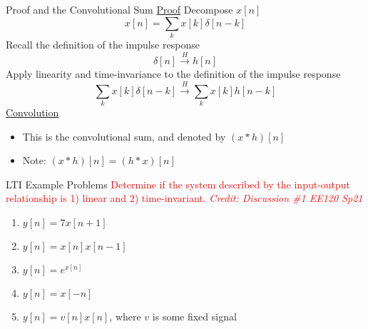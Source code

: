\begin{frame}{Proof and the Convolutional Sum}
    \underline{Proof}
    Decompose $x[n]$
    \[x[n] = \sum_k x[k]\delta[n-k]\]
    Recall the definition of the impulse response
    \[\delta[n] \overset{H}{\longrightarrow} h[n]\]
    Apply linearity and time-invariance to the definition of the impulse response
    \[\sum_k x[k]\delta[n-k] \overset{H}{\longrightarrow} \sum_k x[k]h[n-k]\]
    \underline{Convolution}
\begin{itemize}
    \item This is the convolutional sum, and denoted by $(x * h)[n]$
    \item Note: $(x * h)[n] = (h * x)[n]$
\end{itemize}
\end{frame}

\begin{frame}{LTI Example Problems}
    \textcolor{red}{Determine if the system described by the input-output relationship is 1) linear and 2) time-invariant. {\footnotesize\textit{Credit: Discussion \#1 EE120 Sp21}}}
    \begin{enumerate}
        \item $y[n] = 7x[n+1]$
        \item $y[n] = x[n]x[n-1]$
        \item $y[n] = e^{x[n]}$
        \item $y[n] = x[-n]$
        \item $y[n] = v[n]x[n]$, where $v$ is some fixed signal
    \end{enumerate}
\end{frame}

